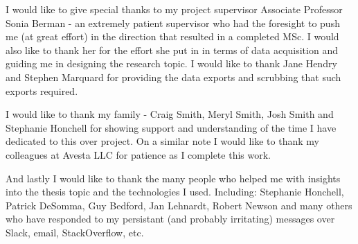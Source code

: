 I would like to give special thanks to my project supervisor Associate Professor Sonia Berman - an extremely patient supervisor who had the foresight to push me (at great effort) in the direction that resulted in a completed MSc. I would also like to thank her for the effort she put in in terms of data acquisition and guiding me in designing the research topic. I would like to thank Jane Hendry and Stephen Marquard for providing the data exports and scrubbing that such exports required.

I would like to thank my family - Craig Smith, Meryl Smith, Josh Smith and Stephanie Honchell for showing support and understanding of the time I have dedicated to this over project. On a similar note I would like to thank my colleagues at Avesta LLC for patience as I complete this work.

And lastly I would like to thank the many people who helped me with insights into the thesis topic and the technologies I used. Including: Stephanie Honchell, Patrick DeSomma, Guy Bedford, Jan Lehnardt, Robert Newson and many others who have responded to my persistant (and probably irritating) messages over Slack, email, StackOverflow, etc.